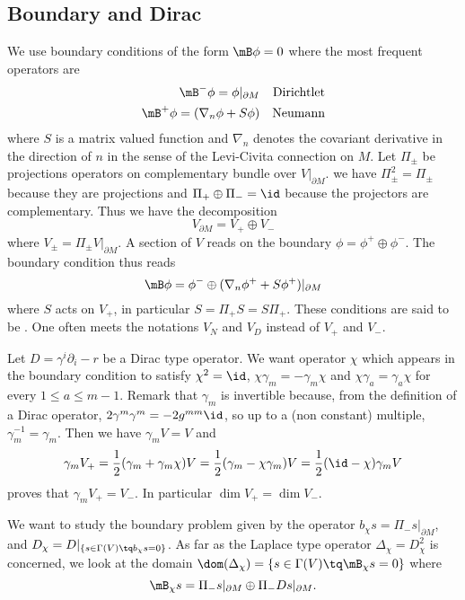 \subsection{Boundary and Dirac}

We use boundary conditions of the form $\mB\phi=0$ where the most frequent operators are
\begin{align*}
		\mB^-\phi=\phi|_{\partial M}		&&\text{Dirichtlet}\\
		\mB^+\phi=(\nabla_n\phi+S\phi)		&&\text{Neumann}
\end{align*}
where $S$ is a matrix valued function and $\nabla_n$ denotes the covariant derivative in the direction of $n$ in the sense of the Levi-Civita connection on $M$. Let $\Pi_{\pm}$ be projections operators on complementary bundle over $V|_{\partial M}$. we have $\Pi_{\pm}^2=\Pi_{\pm}$ because they are projections and $\Pi_{+}\oplus\Pi_-=\id$ because the projectors are complementary. Thus we have the decomposition
\[ 
  V_{\partial M}=V_+\oplus V_-
\]
where $V_{\pm}=\Pi_{\pm}V|_{\partial M}$. A section of $V$ reads on the boundary $\phi=\phi^+\oplus\phi^-$. The boundary condition thus reads
\begin{equation}
\mB\phi=\phi^-\oplus(\nabla_n\phi^++S\phi^+)|_{\partial M}
\end{equation}
where $S$ acts on $V_+$, in particular $S=\Pi_+S=S\Pi_+$. These conditions are said to be . One often meets the notations $V_N$ and $V_D$ instead of $V_+$ and $V_-$.


Let $D=\gamma^i\partial_i-r$ be a Dirac type operator. We want operator $\chi$ which appears in the boundary condition to satisfy $\chi^2=\id$, $\chi\gamma_m=-\gamma_m\chi$ and $\chi\gamma_a=\gamma_a\chi$ for every $1\leq a\leq m-1$. Remark that $\gamma_m$ is invertible because, from the definition of a Dirac operator, $2\gamma^m\gamma^m=-2g^{mm}\id$, so up to a (non constant) multiple, $\gamma_m^{-1}=\gamma_m$. Then we have $\gamma_mV=V$ and
\[ 
  \gamma_mV_+=\frac{ 1 }{2}(\gamma_m+\gamma_m\chi)V=\frac{ 1 }{2}(\gamma_m-\chi\gamma_m)V=\frac{ 1 }{2}(\id-\chi)\gamma_mV
\]
proves that $\gamma_mV_+=V_-$. In particular $\dim V_+=\dim V_-$.

We want to study the boundary problem given by the operator $b_{\chi}s=\Pi_-s|_{\partial M}$, and $D_{\chi}=D|_{\{ s\in\Gamma(V)\tq b_{\chi}s=0 \}}$. As far as the Laplace type operator $\Delta_{\chi}=D_{\chi}^2$ is concerned, we look at the domain $\dom(\Delta_{\chi})=\{ s\in\Gamma(V)\tq \mB_{\chi}s=0 \}$ where
\begin{equation}
  \mB_{\chi}s=\Pi_-s|_{\partial M}\oplus\Pi_-Ds|_{\partial M}.
\end{equation}

